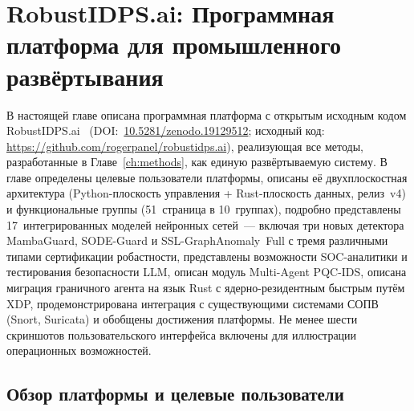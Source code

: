 
\chapter{RobustIDPS.ai: Программная платформа для промышленного развёртывания}
\label{ch:platform}

В настоящей главе описана программная платформа с открытым исходным кодом \textsf{RobustIDPS.ai}~\cite{Anaedevha2026robustidps} (DOI:~\url{10.5281/zenodo.19129512}; исходный код: \url{https://github.com/rogerpanel/robustidps.ai}), реализующая все методы, разработанные в Главе~\ref{ch:methods}, как единую развёртываемую систему. В главе определены целевые пользователи платформы, описаны её двухплоскостная архитектура (Python-плоскость управления + Rust-плоскость данных, релиз~v4) и функциональные группы (51~страница в 10~группах), подробно представлены 17~интегрированных моделей нейронных сетей~--- включая три новых детектора \textsf{MambaGuard}, \textsf{SODE-Guard} и \textsf{SSL-GraphAnomaly~Full} с тремя различными типами сертификации робастности, представлены возможности SOC-аналитики и тестирования безопасности LLM, описан модуль Multi-Agent PQC-IDS, описана миграция граничного агента на язык Rust с ядерно-резидентным быстрым путём XDP, продемонстрирована интеграция с существующими системами СОПВ (Snort, Suricata) и обобщены достижения платформы. Не менее шести скриншотов пользовательского интерфейса включены для иллюстрации операционных возможностей.


\section{Обзор платформы и целевые пользователи}
\label{sec:platform_overview}

